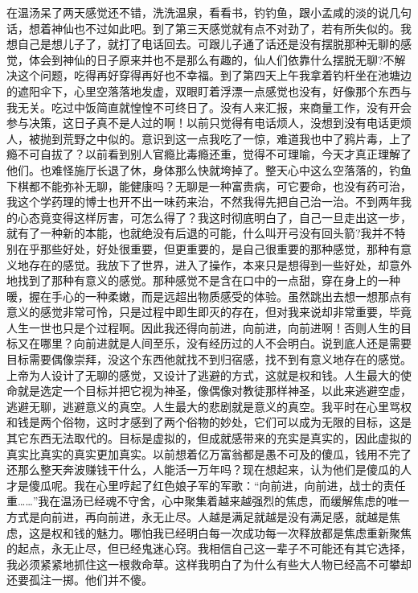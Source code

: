 \documentclass[12pt,oneside]{book}
\begin{document}
在温汤呆了两天感觉还不错，洗洗温泉，看看书，钓钓鱼，跟小孟咸的淡的说几句话，想着神仙也不过如此吧。到了第三天感觉就有点不对劲了，若有所失似的。我想自己是想儿子了，就打了电话回去。可跟儿子通了话还是没有摆脱那种无聊的感觉，体会到神仙的日子原来并也不是那么有趣的，仙人们依靠什么摆脱无聊?不解决这个问题，吃得再好穿得再好也不幸福。到了第四天上午我拿着钓杆坐在池塘边的遮阳伞下，心里空落落地发虚，双眼盯着浮漂一点感觉也没有，好像那个东西与我无关。吃过中饭简直就惶惶不可终日了。没有人来汇报，来商量工作，没有开会参与决策，这日子真不是人过的啊！以前只觉得有电话烦人，没想到没有电话更烦人，被抛到荒野之中似的。意识到这一点我吃了一惊，难道我也中了鸦片毒，上了瘾不可自拔了？以前看到别人官瘾比毒瘾还重，觉得不可理喻，今天才真正理解了他们。也难怪施厅长退了休，身体那么快就垮掉了。整天心中这么空落落的，钓鱼下棋都不能弥补无聊，能健康吗？无聊是一种富贵病，可它要命，也没有药可治，我这个学药理的博士也开不出一味药来治，不然我得先把自己治一治。不到两年我的心态竟变得这样厉害，可怎么得了？我这时彻底明白了，自己一旦走出这一步，就有了一种新的本能，也就绝没有后退的可能，什么叫开弓没有回头箭?我并不特别在乎那些好处，好处很重要，但更重要的，是自己很重要的那种感觉，那种有意义地存在的感觉。我放下了世界，进入了操作，本来只是想得到一些好处，却意外地找到了那种有意义的感觉。那种感觉不是含在口中的一点甜，穿在身上的一种暖，握在手心的一种柔嫩，而是远超出物质感受的体验。虽然跳出去想一想那点有意义的感觉非常可怜，只是过程中即生即灭的存在，但对我来说却非常重要，毕竟人生一世也只是个过程啊。因此我还得向前进，向前进，向前进啊！否则人生的目标又在哪里？向前进就是人间至乐，没有经历过的人不会明白。说到底人还是需要目标需要偶像崇拜，没这个东西他就找不到归宿感，找不到有意义地存在的感觉。上帝为人设计了无聊的感觉，又设计了逃避的方式，这就是权和钱。人生最大的使命就是选定一个目标并把它视为神圣，像偶像对教徒那样神圣，以此来逃避空虚，逃避无聊，逃避意义的真空。人生最大的悲剧就是意义的真空。我平时在心里骂权和钱是两个俗物，这时才感到了两个俗物的妙处，它们可以成为无限的目标，这是其它东西无法取代的。目标是虚拟的，但成就感带来的充实是真实的，因此虚拟的真实比真实的真实更加真实。以前想着亿万富翁都是愚不可及的傻瓜，钱用不完了还那么整天奔波赚钱干什么，人能活一万年吗？现在想起来，认为他们是傻瓜的人才是傻瓜呢。我在心里哼起了红色娘子军的军歌：``向前进，向前进，战士的责任重\ldots\ldots{}''我在温汤已经魂不守舍，心中聚集着越来越强烈的焦虑，而缓解焦虑的唯一方式是向前进，再向前进，永无止尽。人越是满足就越是没有满足感，就越是焦虑，这是权和钱的魅力。哪怕我已经明白每一次成功每一次释放都是焦虑重新聚焦的起点，永无止尽，但已经鬼迷心窍。我相信自己这一辈子不可能还有其它选择，我必须紧紧地抓住这一根救命草。这样我明白了为什么有些大人物已经高不可攀却还要孤注一掷。他们并不傻。
\end{document}

